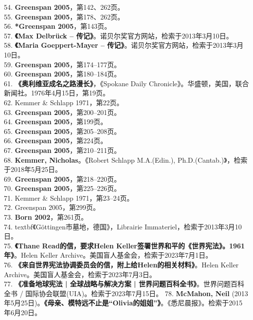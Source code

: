54. \textbf{Greenspan 2005}，第142、262页。\\
55. \textbf{Greenspan 2005}，第178、262页。\\
56. \textbf{*Greenspan 2005}，第143页。\\
57. \textbf{《Max Delbrück – 传记》}。诺贝尔奖官方网站，检索于2013年3月10日。\\
58. \textbf{《Maria Goeppert-Mayer – 传记》}。诺贝尔奖官方网站，检索于2013年3月10日。\\
59. \textbf{Greenspan 2005}，第174–177页。\\
60. \textbf{Greenspan 2005}，第180–184页。\\
61. \textbf{《奥利维亚成名之路漫长》}，《Spokane Daily Chronicle》。华盛顿，美国，联合新闻社。1976年4月15日，第19页。\\
62. Kemmer & Schlapp 1971，第22页。\\
63. \textbf{Greenspan 2005}，第200–201页。\\
64. \textbf{Greenspan 2005}，第199页。\\
65. \textbf{Greenspan 2005}，第205–208页。\\
66. \textbf{Greenspan 2005}，第224页。\\
67. \textbf{Greenspan 2005}，第210–211页。\\
68. \textbf{Kemmer, Nicholas}。《Robert Schlapp M.A.(Edin.), Ph.D.(Cantab.)》，检索于2018年5月25日。\\
69. \textbf{Greenspan 2005}，第218–220页。\\
70. \textbf{Greenspan 2005}，第225–226页。\\
71. Kemmer & Schlapp 1971，第23–24页。\\
72. Greenspan 2005，第299页。\\
73. \textbf{Born 2002}，第261页。\\
74. textbf{《Göttingen市墓地，德国》}，Librairie Immateriel，检索于2013年3月10日。\\
75. \textbf{《Thane Read的信，要求Helen Keller签署世界和平的《世界宪法》。1961年》}。Helen Keller Archive。美国盲人基金会，检索于2023年7月1日。\\
76. \textbf{《来自世界宪法协调委员会的信，附上给Helen的相关材料》}。Helen Keller Archive。美国盲人基金会，检索于2023年7月3日。\\
77. \textbf{《准备地球宪法 | 全球战略与解决方案 | 世界问题百科全书》}。世界问题百科全书 / 国际协会联盟(UIA)。检索于2023年7月15日。  
78. \textbf{McMahon, Neil} (2013年5月25日)。\textbf{《母亲、模特远不止是“Olivia的姐姐”》}。《悉尼晨报》。检索于2015年6月20日。\\
